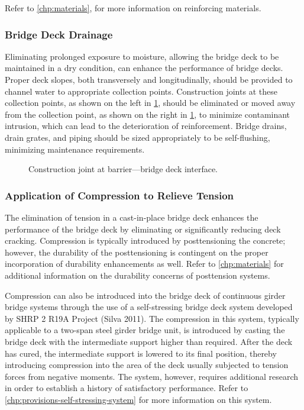 Refer to \cref{chp:materials}, for more information on reinforcing materials.

\subsubsection{Bridge Deck Drainage}
Eliminating prolonged exposure to moisture, allowing the bridge deck to be maintained in a dry condition, can enhance the performance of bridge decks. Proper deck slopes, both transversely and longitudinally, should be provided to channel water to appropriate collection points. Construction joints at these collection points, as shown on the left in \cref{fig:joint-barrier}, should be eliminated or moved away from the collection point, as shown on the right in \cref{fig:joint-barrier}, to minimize contaminant intrusion, which can lead to the deterioration of reinforcement. Bridge drains, drain grates, and piping should be sized appropriately to be self-flushing, minimizing maintenance requirements.

\begin{figure}
  \caption{Construction joint at barrier—bridge deck interface.}
  \label{fig:joint-barrier}
\end{figure}

\subsubsection{Application of Compression to Relieve Tension}
The elimination of tension in a cast-in-place bridge deck enhances the performance of the bridge deck by eliminating or significantly reducing deck cracking. Compression is typically introduced by posttensioning the concrete; however, the durability of the posttensioning is contingent on the proper incorporation of durability enhancements as well. Refer to \cref{chp:materials} for additional information on the durability concerns of posttension systems.

Compression can also be introduced into the bridge deck of continuous girder bridge systems through the use of a self-stressing bridge deck system developed by SHRP 2 R19A Project (Silva 2011). The compression in this system, typically applicable to a two-span steel girder bridge unit, is introduced by casting the bridge deck with the intermediate support higher than required. After the deck has cured, the intermediate support is lowered to its final position, thereby introducing compression into the area of the deck usually subjected to tension forces from negative moments. The system, however, requires additional research in order to establish a history of satisfactory performance. Refer to \cref{chp:provisions-self-stressing-system} for more information on this system.

